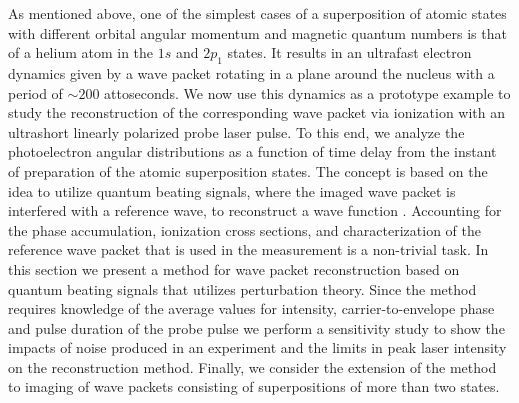 
As mentioned above, one of the simplest cases of a superposition of atomic states with different orbital angular momentum and magnetic quantum numbers is that of a helium atom in the $1s$ and $2p_1$ states. It results in an ultrafast electron dynamics given by a wave packet rotating in a plane around the nucleus with a period of $\sim200$ attoseconds. We now use this dynamics as a prototype example to study the reconstruction of the corresponding wave packet via ionization with an ultrashort linearly polarized probe laser pulse.  To this end, we analyze the photoelectron angular distributions as a function of time delay from the instant of preparation of the atomic superposition states. The concept is based on the idea to utilize quantum beating signals, where the imaged wave packet is interfered with a reference wave, to reconstruct a wave function \cite{paul2001,muller2002,mauritsson2010,klunder2013,priebe2017,jiang2020}. Accounting for the phase accumulation, ionization cross sections, and characterization of the reference wave packet that is used in the measurement is a non-trivial task. In this section we present a method for wave packet reconstruction based on quantum beating signals that utilizes perturbation theory. Since the method requires knowledge of the average values for intensity, carrier-to-envelope phase and pulse duration of the probe pulse we perform a sensitivity study to show the impacts of noise produced in an experiment and the limits in peak laser intensity on the reconstruction method. Finally, we consider the extension of the method to  imaging of wave packets consisting of superpositions of more than two states.

